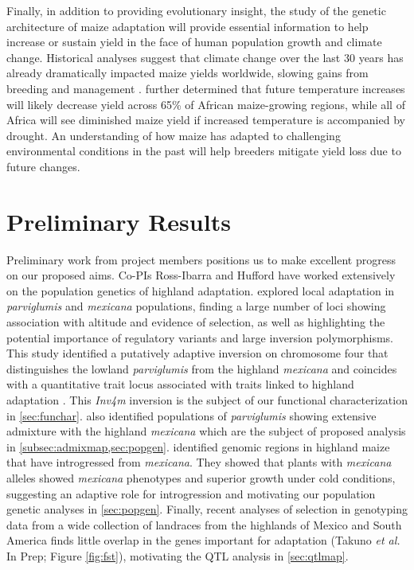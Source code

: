 Finally, in addition to providing evolutionary insight, the study of the genetic architecture of maize adaptation will provide essential information to help increase or sustain yield in the face of human population growth and climate change. Historical analyses suggest that climate change over the last 30 years has already dramatically impacted maize yields worldwide, slowing gains from breeding and management \citep{Lobell2011}.  \citet{Lobell2011b} further determined that future temperature increases will likely decrease yield across 65\% of African maize-growing regions, while all of Africa will see diminished maize yield if increased temperature is accompanied by drought.  An understanding of how maize has adapted to challenging environmental conditions in the past will help breeders mitigate yield loss due to future changes.

\section*{Preliminary Results}
Preliminary work from project members positions us to make excellent progress on our proposed aims. Co-PIs Ross-Ibarra and Hufford have worked extensively on the population genetics of highland adaptation.    \citet{Pyhajarvi2013} explored local adaptation in \emph{parviglumis} and \emph{mexicana} populations, finding a large number of loci showing association with altitude and evidence of selection, as well as highlighting the potential importance of regulatory variants and large inversion polymorphisms. This study identified a putatively adaptive inversion on chromosome four that distinguishes the lowland \emph{parviglumis} from the highland \emph{mexicana} and coincides with a quantitative trait locus associated with  traits  linked to highland adaptation \citep{Lauter2004a}. This \emph{Inv4m} inversion is the subject of our functional characterization in \ref{sec:funchar}.  \citet{Pyhajarvi2013} also identified populations of \emph{parviglumis} showing extensive admixture with the highland \emph{mexicana} which are the subject of proposed analysis in \ref{subsec:admixmap,sec:popgen}. \citet{Hufford2013} identified genomic regions in highland maize that have introgressed from \emph{mexicana}.  They showed that  plants with \emph{mexicana} alleles showed \emph{mexicana} phenotypes and superior growth under cold conditions, suggesting an adaptive role for introgression and motivating our population genetic analyses in \ref{sec:popgen}.  Finally, recent analyses of selection in genotyping data from a wide collection of landraces from the highlands of Mexico and South America finds little overlap in the genes important for adaptation (Takuno \emph{et al.} In Prep; Figure \ref{fig:fst}), motivating the QTL analysis in \ref{sec:qtlmap}.

